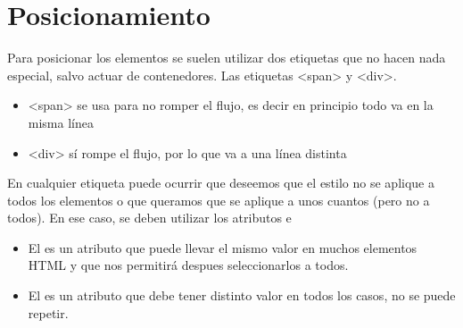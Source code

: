 \documentclass[letterpaper,10pt,spanish]{sphinxmanual}
\begin{document}
\section{Posicionamiento}
\label{tema3:posicionamiento}
Para posicionar los elementos se suelen utilizar dos etiquetas que no hacen nada especial, salvo actuar de contenedores. Las etiquetas \textless{}span\textgreater{} y \textless{}div\textgreater{}.
\begin{itemize}
\item {} 
\textless{}span\textgreater{} se usa para no romper el flujo, es decir en principio todo va en la misma línea

\item {} 
\textless{}div\textgreater{} sí rompe el flujo, por lo que va a una línea distinta

\end{itemize}

En cualquier etiqueta puede ocurrir que deseemos que el estilo no se aplique a todos los elementos o que queramos que se aplique a unos cuantos (pero no a todos). En ese caso, se deben utilizar los atributos  e 
\begin{itemize}
\item {} 
El  es un atributo que puede llevar el mismo valor en muchos elementos HTML y que nos permitirá despues seleccionarlos a todos.

\item {} 
El  es un atributo que debe tener distinto valor en todos los casos, no se puede repetir.

\end{itemize}
\end{document}
